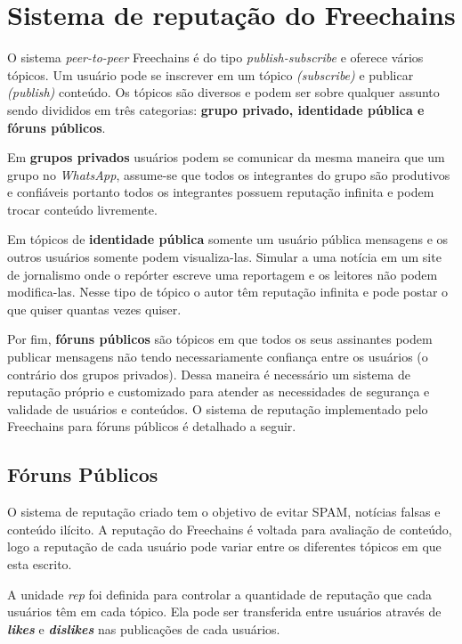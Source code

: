 \documentclass[12pt]{article}
\newcommand{\FC} {Freechains\xspace}
\newcommand{\PtoP} {\emph{peer-to-peer}\xspace}
\begin{document}
\section{Sistema de reputação do \FC} \label{sec:freechains}

O sistema \PtoP \FC é do tipo \emph{publish-subscribe} e oferece vários tópicos. Um usuário pode se inscrever em um tópico \emph{(subscribe)} e publicar \emph{(publish)} conteúdo. Os tópicos são diversos e podem ser sobre qualquer assunto sendo divididos 
em três categorias: \textbf{grupo privado, identidade pública e fóruns públicos}. 

Em \textbf{grupos privados} usuários podem se comunicar da mesma maneira que um grupo no \emph{WhatsApp}, assume-se que todos os integrantes do grupo são produtivos e confiáveis portanto todos os integrantes possuem reputação infinita e podem trocar conteúdo livremente.

Em tópicos de \textbf{identidade pública} somente um usuário pública mensagens e os outros usuários somente podem visualiza-las. Simular a uma notícia em um site de jornalismo onde o repórter escreve uma reportagem e os leitores não podem modifica-las. Nesse tipo de tópico o autor têm reputação infinita e pode postar o que quiser quantas vezes quiser.

Por fim, \textbf{fóruns públicos} são tópicos em que todos os seus assinantes podem publicar mensagens não tendo necessariamente confiança entre os usuários (o contrário dos grupos privados). Dessa maneira é necessário um sistema de reputação próprio e customizado para atender as necessidades de segurança e validade de usuários e conteúdos. O sistema de reputação implementado pelo \FC para fóruns públicos é detalhado a seguir.

\subsection{Fóruns Públicos} \label{subsec: forunspub}

O sistema de reputação criado tem o objetivo de evitar SPAM, notícias falsas e conteúdo ilícito. A reputação do \FC é voltada para avaliação de conteúdo, logo a reputação de cada usuário pode variar entre os diferentes tópicos em que esta escrito. 

A unidade \emph{rep} foi definida para controlar a quantidade de reputação que cada usuários têm em cada tópico. Ela pode ser transferida entre usuários através de \textbf{\emph{likes}} e \textbf{\emph{dislikes}} nas publicações de cada usuários.
\end{document}
